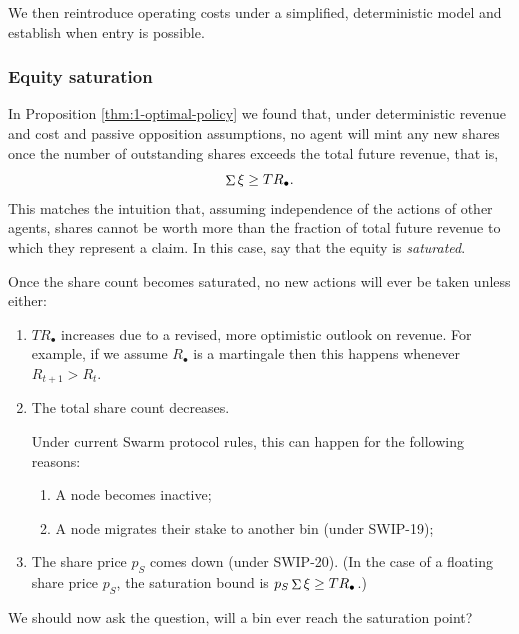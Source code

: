 We then reintroduce operating costs under a simplified, deterministic model and establish when entry is possible.

\subsubsection{Equity saturation}
\label{section:saturation}

In Proposition \ref{thm:1-optimal-policy} we found that, under deterministic revenue and cost and passive opposition assumptions, no agent will mint any new shares once the number of outstanding shares exceeds the total future revenue, that is,
\[
  \mathop{\Sigma}\xi \geq TR_\bullet.
\]
%
This matches the intuition that, assuming independence of the actions of other agents, shares cannot be worth more than the fraction of total future revenue to which they represent a claim.
%
In this case, say that the equity is \emph{saturated}.

Once the share count becomes saturated, no new actions will ever be taken unless either:
\begin{enumerate}
  \item 
    $TR_\bullet$ increases due to a revised, more optimistic outlook on revenue.
    For example, if we assume $R_\bullet$ is a martingale then this happens whenever $R_{t+1}>R_t$.
  \item The total share count decreases. 
  
    Under current Swarm protocol rules, this can happen for the following reasons:
  \begin{enumerate}
    \item A node becomes inactive;
    \item A node migrates their stake to another bin (under SWIP-19);
  \end{enumerate}
  \item The share price $p_S$ comes down (under SWIP-20). (In the case of a floating share price $p_S$, the saturation bound is $p_S\mathop{\Sigma}\xi\geq TR_\bullet$.)
\end{enumerate}

We should now ask the question, will a bin ever reach the saturation point?

